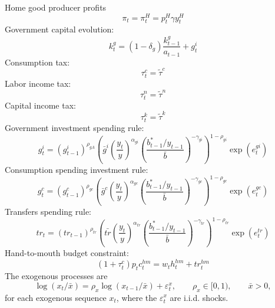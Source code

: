 \documentclass[12pt]{article}
\begin{document}
Home good producer profits
\begin{equation}
\pi_t = \pi^H_t = p_t^H\gamma y_t^H
\label{eq:EE_37}
\end{equation}%
Government capital evolution:
\begin{equation}
k^g_{t} = (1-\delta_g)\frac{k^g_{t-1}}{a_{t-1}} + g^i_t
\label{eq:EE_38}
\end{equation}%
Consumption tax:
\begin{equation}
\tau_t^c = \tilde{\tau}^c
\label{eq:EE_39}
\end{equation}%
Labor income tax:
\begin{equation}
\tau_t^n = \tilde{\tau}^n
\label{eq:EE_40}
\end{equation}%
Capital income tax:
\begin{equation}
\tau_t^k = \tilde{\tau}^k
\label{eq:EE_41}
\end{equation}%
Government investment spending rule:
\begin{equation}
 g_t^i =\left( g^i_{t-1}\right)^{\rho_{g A}}\left(\bar{g}^i\left(\frac{y_t}{y}\right)^{\alpha_{gi}}\left(\frac{b_{t-1}^{\ast}/y_{t-1}}{\bar{b}}\right)^{-\gamma_{gi}}\right)^{1-\rho_{g i}}\exp(e_t^{gi})  
 \label{eq:EE_42}
\end{equation}
Consumption spending investment rule:
\begin{equation}
 g_t^c =\left( g^c_{t-1}\right)^{\rho_{g c}}\left(\bar{g}^c\left(\frac{y_t}{y}\right)^{\alpha_{gc}}\left(\frac{b_{t-1}^{\ast} /y_{t-1}}{\bar{b}}\right)^{-\gamma_{gc}}\right)^{1-\rho_{g c}}\exp(e_t^{gc})   
 \label{eq:EE_43}
\end{equation}
Transfers spending rule:
\begin{equation}
tr_t =\left( tr_{t-1}\right)^{\rho_{tr}}\left(\bar{tr}\left(\frac{y_t}{y}\right)^{\alpha_{tr}}\left(\frac{b_{t-1}^{\ast}/y_{t-1}}{\bar{b}}\right)^{-\gamma_{tr}}\right)^{1-\rho_{tr}}\exp(e_t^{tr})   
 \label{eq:EE_44}
\end{equation}
Hand-to-mouth budget constraint:
\begin{equation}
(1+\tau_t^c)p_tc_t^{hm} = w_th_t^{hm} + tr_t^{hm}
\label{eq:EE_45}
\end{equation}  
The exogenous processes are%
\begin{equation*}
\log \left( x_{t}/\bar{x}\right) =\rho _{x}\log \left( x_{t-1}/\bar{x}%
\right) +\varepsilon _{t}^{x},\qquad \rho _{x}\in \lbrack 0,1),\qquad \bar{x}%
>0,
\end{equation*}%
for each exogenous sequence $x_t$, where the $\varepsilon _{t}^{x}$ are i.i.d. shocks.
\end{document}
